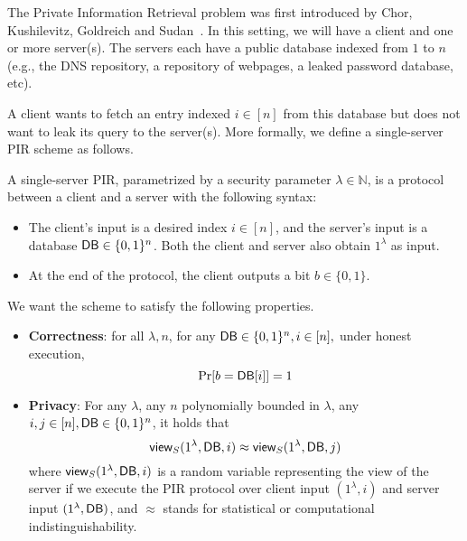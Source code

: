 
The Private Information Retrieval problem was first introduced by Chor, Kushilevitz, Goldreich and Sudan~\cite{chor1998private}.
In this setting, we will have a client and 
one or more server(s). The servers each have a public database indexed from $1$ to $n$ (e.g., the DNS repository, 
a repository of webpages, a leaked password database, etc).

A client wants to fetch an entry 
indexed $i \in [n]$ 
from this database 
but does not want to leak its query to the server(s). More formally,
we define a single-server PIR scheme as follows.

\begin{definition}
A single-server PIR, parametrized
by a security parameter $\lambda \in \mathbb{N}$, is a 
protocol between a client and a server with the following
syntax: 
\begin{itemize}
	\item The client's input is a desired 
index $i \in [n]$, and the server's input is a database ${\sf DB} \in \{0,1\}^n$.
Both the client and server also obtain $1^\lambda$ as input. 
	\item At the end of the protocol, the client outputs a bit $b \in \{0,1\}$.
\end{itemize}

We want the scheme to satisfy the following properties.
\begin{itemize}
\item \textbf{Correctness}: for all $\lambda, n$, 
for any ${\sf DB} \in \{0,1\}^n, i \in [n],$ under honest execution, 
	\[\Pr[b = \DB[i]] = 1 %
\]
	
\item \textbf{Privacy}: For any $\lambda$, 
any $n$ polynomially bounded in $\lambda$, any 
$i,j \in [n], {\sf DB}  \in \{0,1\}^n$, 
it holds that  
	\[{\sf view}_S(1^\lambda, {\sf DB},i) \approx {\sf view}_S(1^\lambda, {\sf DB},j)\]
where ${\sf view}_S(1^\lambda, {\sf DB}, i)$ 
is a random variable representing the view of the server  
if we execute the PIR protocol 
over client input $(1^\lambda, i)$ and server input $(1^\lambda, {\sf DB})$, 
and $\approx$ stands for 
statistical or computational indistinguishability.
\end{itemize}
\end{definition}

